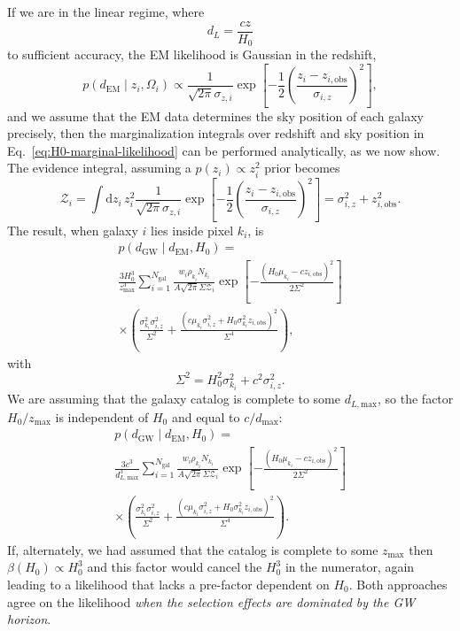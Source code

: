 \documentclass[modern]{article}
\newcommand{\dd}{\mathrm{d}}
\newcommand{\dEM}{d_{\mathrm{EM}}}
\newcommand{\dGW}{d_{\mathrm{GW}}}
\newcommand{\Ngal}{N_{\mathrm{gal}}}
\begin{document}
If we are in the linear regime, where
%
\begin{equation}
    d_L = \frac{c z}{H_0}
\end{equation}
%
to sufficient accuracy, the \ac{EM} likelihood is Gaussian in the redshift,
%
\begin{equation}
    p\left( \dEM \mid z_i, \Omega_i \right) \propto \frac{1}{\sqrt{2\pi} \sigma_{z,i}} \exp\left[ -\frac{1}{2} \left( \frac{z_i - z_{i,\mathrm{obs}}}{\sigma_{i,z}} \right)^2 \right],
\end{equation}
%
and we assume that the \ac{EM} data determines the sky position of each galaxy
precisely, then the marginalization integrals over redshift and sky position in
Eq.\ \eqref{eq:H0-marginal-likelihood} can be performed analytically, as we now
show. The evidence integral, assuming a $p\left( z_i \right) \propto z_i^2$
prior becomes
%
\begin{equation}
  \mathcal{Z}_i = \int \dd z_i \, z_i^2 \frac{1}{\sqrt{2\pi} \sigma_{z,i}} \exp\left[ -\frac{1}{2} \left( \frac{z_i - z_{i,\mathrm{obs}}}{\sigma_{i,z}} \right)^2 \right] = \sigma_{i,z}^2 + z_{i,\mathrm{obs}}^2.
\end{equation}
%
The result, when galaxy $i$ lies inside pixel $k_i$, is
%
\begin{multline}
     p\left( \dGW \mid \dEM, H_0 \right) = \\ \frac{3 H_0^3}{z_\mathrm{max}^3} \sum_{i=1}^{\Ngal} \frac{w_i \rho_{k_i} N_{k_i}}{A \sqrt{2\pi} \Sigma \mathcal{Z}_i} \exp\left[ -\frac{\left(H_0 \mu_{k_i} - c z_{i,\mathrm{obs}}\right)^2}{2 \Sigma^2} \right] \\ \times \left( \frac{\sigma_{k_i}^2 \sigma_{i,z}^2}{\Sigma^2} + \frac{\left( c \mu_{k_i} \sigma_{i,z}^2 + H_0 \sigma_{k_i}^2 z_{i,\mathrm{obs}} \right)^2}{\Sigma^4} \right),
\end{multline}
%
with
%
\begin{equation}
    \Sigma^2 = H_0^2 \sigma_{k_i}^2 + c^2 \sigma_{i,z}^2.
\end{equation}
%
We are assuming that the galaxy catalog is complete to some $d_{L,
\mathrm{max}}$, so the factor $H_0/z_\mathrm{max}$ is independent of $H_0$ and
equal to $c/d_\mathrm{max}$:
%
\begin{multline}
  p\left( \dGW \mid \dEM, H_0\right) = \\ \frac{3 c^3}{d_{L,\mathrm{max}}^3} \sum_{i=1}^{\Ngal} \frac{w_i \rho_{k_i} N_{k_i}}{A \sqrt{2\pi} \Sigma \mathcal{Z}_i} \exp\left[ -\frac{\left(H_0 \mu_{k_i} - c z_{i,\mathrm{obs}}\right)^2}{2 \Sigma^2} \right] \\ \times \left( \frac{\sigma_{k_i}^2 \sigma_{i,z}^2}{\Sigma^2} + \frac{\left( c \mu_{k_i} \sigma_{i,z}^2 + H_0 \sigma_{k_i}^2 z_{i,\mathrm{obs}} \right)^2}{\Sigma^4} \right).
\end{multline}
%
If, alternately, we had assumed that the catalog is complete to some
$z_\mathrm{max}$ then $\beta\left( H_0 \right) \propto H_0^3$ and this factor
would cancel the $H_0^3$ in the numerator, again leading to a likelihood that
lacks a pre-factor dependent on $H_0$.  Both approaches agree on the likelihood
\emph{when the selection effects are dominated by the \ac{GW} horizon}.
\end{document}
